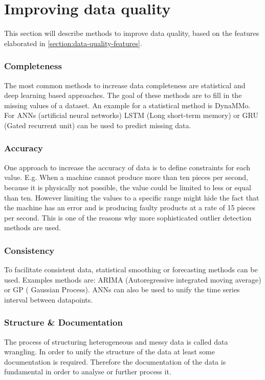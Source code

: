 \section{Improving data quality}\label{section:imrpoving-data-quality}
This section will describe methods to improve data quality, based on the features elaborated in \autoref{section:data-quality-features}.
\subsubsection{Completeness}
The most common methods to increase data completeness are statistical and deep learning based approaches. The goal of these methods are to fill in the missing values of a dataset. An example for a statistical method is DynaMMo\cite{liDynaMMoMiningSummarization2009}. For ANNs (artificial neural networks) \ac{LSTM} (Long short-term memory) or \ac{GRU} (Gated recurrent unit) can be used to predict missing data. \cite{songIoTDataQuality2020}
\subsubsection{Accuracy}
One approach to increase the accuracy of data is to define constraints for each value. E.g. When a machine cannot produce more than ten pieces per second, because it is physically not possible, the value could be limited to less or equal than ten. However limiting the values to a specific range might hide the fact that the machine  has an error and is producing faulty products at a rate of 15 pieces per second. This is one of the reasons why more sophisticated outlier detection methods are used. \cite{songIoTDataQuality2020}

\subsubsection{Consistency}
To facilitate consistent data, statistical smoothing or forecasting methods can be used. Examples methods are: \ac{ARIMA} (Autoregressive integrated moving average) or \ac{GP} ( Gaussian Process). ANNs can also be used to unify the time series interval between datapoints. \cite{songIoTDataQuality2020}

\subsubsection{Structure \& Documentation}
The process of structuring heterogeneous and messy data is called data wrangling. In order to unify the structure of the data at least some documentation is required. Therefore the documentation of the data is fundamental in order to analyse or further process it. 